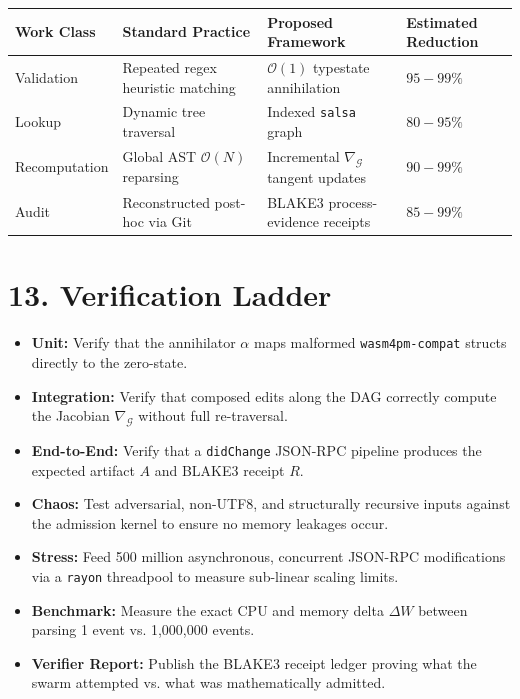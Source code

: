 \begin{table}[h]
\centering
\begin{tabular}{|l|l|l|l|}
\hline
\textbf{Work Class} & \textbf{Standard Practice} & \textbf{Proposed Framework} & \textbf{Estimated Reduction} \\ \hline
Validation & Repeated regex heuristic matching & $\mathcal{O}(1)$ typestate annihilation & $95 - 99\%$ \\ \hline
Lookup & Dynamic tree traversal & Indexed \texttt{salsa} graph & $80 - 95\%$ \\ \hline
Recomputation & Global AST $\mathcal{O}(N)$ reparsing & Incremental $\nabla_{\mathcal{G}}$ tangent updates & $90 - 99\%$ \\ \hline
Audit & Reconstructed post-hoc via Git & BLAKE3 process-evidence receipts & $85 - 99\%$ \\ \hline
\end{tabular}
\end{table}

\section{13. Verification Ladder}
\begin{itemize}
    \item \textbf{Unit:} Verify that the annihilator $\alpha$ maps malformed \texttt{wasm4pm-compat} structs directly to the zero-state.
    \item \textbf{Integration:} Verify that composed edits along the DAG correctly compute the Jacobian $\nabla_{\mathcal{G}}$ without full re-traversal.
    \item \textbf{End-to-End:} Verify that a \texttt{didChange} JSON-RPC pipeline produces the expected artifact $A$ and BLAKE3 receipt $R$.
    \item \textbf{Chaos:} Test adversarial, non-UTF8, and structurally recursive inputs against the admission kernel to ensure no memory leakages occur.
    \item \textbf{Stress:} Feed 500 million asynchronous, concurrent JSON-RPC modifications via a \texttt{rayon} threadpool to measure sub-linear scaling limits.
    \item \textbf{Benchmark:} Measure the exact CPU and memory delta $\Delta W$ between parsing 1 event vs. 1,000,000 events.
    \item \textbf{Verifier Report:} Publish the BLAKE3 receipt ledger proving what the swarm attempted vs. what was mathematically admitted.
\end{itemize}


